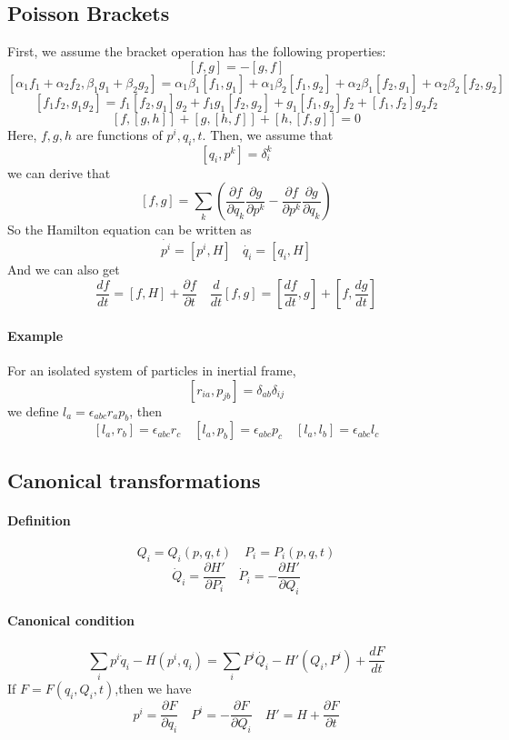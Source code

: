 \documentclass{article}
\begin{document}
\subsection{Poisson Brackets}
First, we assume the bracket operation has the following properties:
\[ \left[f,g\right]=-\left[g,f\right] \]
\[\left[\alpha_1 f_1+\alpha_2 f_2,\beta_1 g_1+\beta_2 g_2\right]=\alpha_1 \beta_1\left[f_1,g_1\right]
+\alpha_1 \beta_2\left[f_1,g_2\right]+\alpha_2 \beta_1\left[f_2,g_1\right]+\alpha_2 \beta_2\left[f_2,g_2\right]\]
\[\left[f_1 f_2,g_1 g_2\right]=f_1\left[f_2,g_1\right]g_2+f_1 g_1\left[f_2,g_2\right]+g_1\left[f_1,g_2\right]f_2 +\left[f_1,f_2\right]g_2 f_2 \]
\[\left[f,\left[g,h\right]\right]+\left[g,\left[h,f\right]\right]+\left[h,\left[f,g\right]\right]=0\]
Here, $f,g,h$ are functions of $p^i,q_i,t$.
Then, we assume that
\[\left [q_i,p^k\right ]=\delta^{k}_{i}\]
we can derive that 
\[ \left[f,g\right]=\sum_k(\frac{\partial f}{\partial q_k} \frac{\partial g}{\partial p^k} - \frac{\partial f}{\partial p^k} \frac{\partial g}{\partial q_k}  )\]
So the Hamilton equation can be written as
\[\dot{p^i}=\left[ p^i,H \right] \ \ \ \ \dot{q_i}=\left[ q_i,H \right]\]
And we can also get
\[\frac{df}{dt} = [f,H] + \frac{\partial f}{\partial t} \quad \frac{d}{dt} [f,g] = [\frac{df}{dt},g] + [f,\frac{dg}{dt}]\]
\paragraph{Example}  For an isolated system of particles in inertial frame, 
\[[r_{ia},p_{jb}] = \delta_{ab} \delta_{ij}\]
we define $l_a = \epsilon_{abc} r_{a} p_{b}$, then
\[[l_a,r_b] = \epsilon_{abc}r_c \quad [l_a,p_b] = \epsilon_{abc}p_c \quad [l_a,l_b] = \epsilon_{abc}l_c\]

\subsection{Canonical transformations}
\paragraph{Definition} 
\[Q_i = Q_i(p,q,t) \quad P_i=P_i(p,q,t)\]
\[\dot{Q}_i = \frac{\partial H'}{\partial P_i} \quad \dot{P}_i = -\frac{\partial H'}{\partial Q_i}\]
\paragraph{Canonical condition}
\[\sum_i p^i\dot{q}_i-H(p^i,q_i) = \sum_i P^i\dot{Q_i} - H'(Q_i,P^i) + \frac{dF}{dt}\]
If $F=F(q_i,Q_i,t)$,then we have
\[p^i = \frac{\partial F}{\partial q_i} \quad P^i = -\frac{\partial F}{\partial Q_i} \quad H' = H + \frac{\partial F}{\partial t}\]
\end{document}

